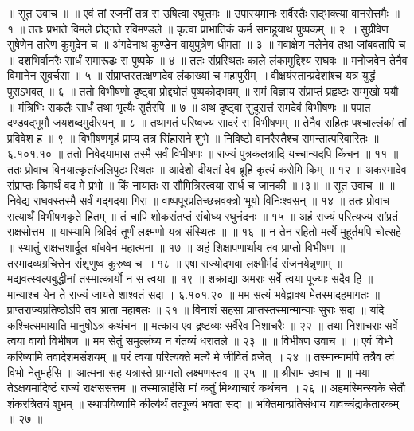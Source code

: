 ॥ सूत उवाच ॥ ॥
एवं तां रजनीं तत्र स उषित्वा रघूत्तमः ॥
उपास्यमानः सर्वैस्तैः सद्भक्त्या वानरोत्तमैः ॥ १ ॥
ततः प्रभाते विमले प्रोद्गते रविमण्डले ॥
कृत्वा प्राभातिकं कर्म समाहूयाथ पुष्पकम् ॥ २ ॥
सुग्रीवेण सुषेणेन तारेण कुमुदेन च ॥
अंगदेनाथ कुण्डेन वायुपुत्रेण धीमता ॥ ३ ॥
गवाक्षेण नलेनेव तथा जांबवतापि च ॥
दशभिर्वानरैः सार्धं समारूढः स पुष्पके ॥ ४ ॥
ततः संप्रस्थितः काले लंकामुद्दिश्य राघवः ॥
मनोजवेन तेनैव विमानेन सुवर्चसा ॥ ५ ॥
संप्राप्तस्तत्क्षणादेव लंकाख्यां च महापुरीम् ॥
वीक्षयंस्तान्प्रदेशांश्च यत्र युद्धं पुराऽभवत् ॥ ६ ॥
ततो विभीषणो दृष्ट्वा प्रोद्द्योतं पुष्पकोद्भवम् ॥
रामं विज्ञाय संप्राप्तं प्रहृष्टः सम्मुखो ययौ ॥
मंत्रिभिः सकलैः सार्धं तथा भृत्यैः सुतैरपि ॥ ७ ॥
अथ दृष्ट्वा सुदूरात्तं रामदेवं विभीषणः ॥
पपात दण्डवद्भूमौ जयशब्दमुदीरयन् ॥ ८ ॥
तथागतं परिष्वज्य सादरं स विभीषणम् ॥
तेनैव सहितः पश्चाल्लंकां तां प्रविवेश ह ॥ ९ ॥
विभीषणगृहं प्राप्य तत्र सिंहासने शुभे ॥
निविष्टो वानरैस्तैश्च समन्तात्परिवारितः ॥ ६.१०१.१० ॥
ततो निवेदयामास तस्मै सर्वं विभीषणः ॥
राज्यं पुत्रकलत्रादि यच्चान्यदपि किंचन ॥ ११ ॥
ततः प्रोवाच विनयात्कृतांजलिपुटः स्थितः ॥
आदेशो दीयतां देव ब्रूहि कृत्यं करोमि किम् ॥ १२ ॥
अकस्मादेव संप्राप्तः किमर्थं वद मे प्रभो ॥
किं नायातः स सौमित्रिस्त्वया सार्ध च जानकी ॥।३॥
॥ सूत उवाच ॥ ॥
निवेद्य राघवस्तस्मै सर्वं गद्गदया गिरा ॥
वाष्पपूरप्रतिच्छन्नवक्त्रो भूयो विनिःश्वसन् ॥ १४ ॥
ततः प्रोवाच सत्यार्थं विभीषणकृते हितम् ॥
तं चापि शोकसंतप्तं संबोध्य रघुनंदनः ॥ १५ ॥
अहं राज्यं परित्यज्य सांप्रतं राक्षसोत्तम ॥
यास्यामि त्रिदिवं तूर्णं लक्ष्मणो यत्र संस्थितः ॥ ॥ १६ ॥
न तेन रहितो मर्त्ये मुहूर्तमपि चोत्सहे ॥
स्थातुं राक्षसशार्दूल बांधवेन महात्मना ॥ १७ ॥
अहं शिक्षापणार्थाय तव प्राप्तो विभीषण ॥
तस्मादव्यग्रचित्तेन संशृणुष्व कुरुष्व च ॥ १८ ॥
एषा राज्योद्भवा लक्ष्मीर्मदं संजनयेन्नृणाम् ॥
मद्यवत्स्वल्पबुद्धीनां तस्मात्कार्यो न स त्वया ॥ १९ ॥
शक्राद्या अमराः सर्वे त्वया पूज्याः सदैव हि ॥
मान्याश्च येन ते राज्यं जायते शाश्वतं सदा । ६.१०१.२० ॥
मम सत्यं भवेद्वाक्य मेतस्मादहमागतः ॥
प्राप्तराज्यप्रतिष्ठोऽपि तव भ्राता महाबलः ॥ २१ ॥
विनाशं सहसा प्राप्तस्तस्मान्मान्याः सुराः सदा ॥
यदि कश्चित्समायाति मानुषोऽत्र कथंचन ॥
मत्काय एव द्रष्टव्यः सर्वैरेव निशाचरैः ॥ २२ ॥
तथा निशाचराः सर्वे त्वया वार्या विभीषण ॥
मम सेतुं समुल्लंघ्य न गंतव्यं धरातले ॥ २३ ॥
॥ विभीषण उवाच ॥ ॥
एवं विभो करिष्यामि तवादेशमसंशयम् ॥
परं त्वया परित्यक्ते मर्त्ये मे जीवितं व्रजेत् ॥ २४ ॥
तस्मान्मामपि तत्रैव त्वं विभो नेतुमर्हसि ॥
आत्मना सह यत्रास्ते प्राग्गतो लक्ष्मणस्तव ॥ २५ ॥
॥ श्रीराम उवाच ॥ ॥
मया तेऽक्षयमादिष्टं राज्यं राक्षससत्तम ॥
तस्मान्नार्हसि मां कर्तुं मिथ्याचारं कथंचन ॥ २६ ॥
अहमस्मिन्स्वके सेतौ शंकरत्रितयं शुभम् ॥
स्थापयिष्यामि कीर्त्यर्थं तत्पूज्यं भवता सदा ॥
भक्तिमान्प्रतिसंधाय यावच्चंद्रार्कतारकम् ॥ २७ ॥
